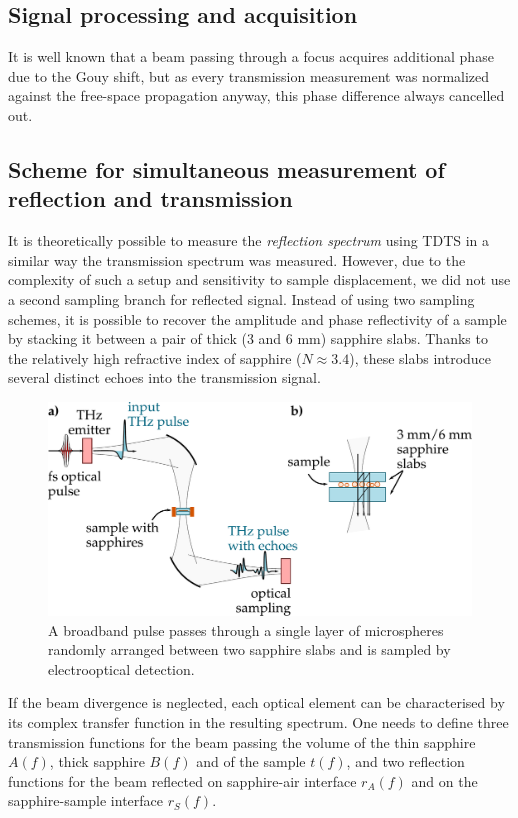 \subsection{Signal processing and acquisition}%

It is well known that a beam passing through a focus acquires additional phase due to  the Gouy shift, but as every transmission measurement was normalized against the free-space propagation anyway, this phase difference always cancelled out. 
\subsection{Scheme for simultaneous measurement of reflection and transmission}%
It is theoretically possible to measure the \textit{reflection spectrum} using TDTS in a similar way the transmission spectrum was measured. However, due to the complexity of such a setup and sensitivity to sample displacement, we did not use a second sampling branch for reflected signal. Instead of using two sampling schemes, it is possible to recover the amplitude and phase reflectivity of a sample by stacking it between a pair of thick (3 and 6 mm) sapphire slabs. Thanks to the relatively high refractive index of sapphire ($N \approx 3.4$), these slabs introduce several distinct  echoes into the transmission signal.

\begin{figure} \caption{A broadband pulse passes through a single layer of microspheres randomly arranged between two sapphire slabs and is sampled by electrooptical detection.}  \centering \includegraphics[width=12cm]{img/expe/sample_sapphires.pdf} \end{figure} \clearpage

If the beam divergence is neglected, each optical element can be characterised by its complex transfer function in the resulting spectrum. One needs to define three transmission functions for the beam passing the volume of the thin sapphire $A(f)$, thick sapphire $B(f)$ and of the sample $t(f)$, and two reflection functions for the beam reflected on sapphire-air interface $r_{A}(f)$ and on the sapphire-sample interface $r_S(f)$. 

